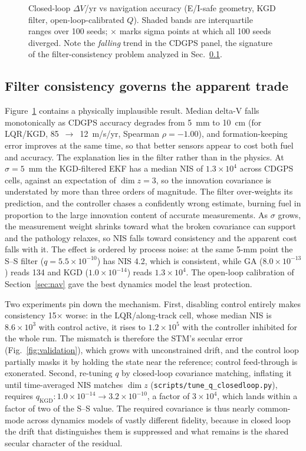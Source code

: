 \begin{figure}[t]
  \centering
  \caption{Closed-loop $\Delta V$/yr vs navigation accuracy (E/I-safe
  geometry, KGD filter, open-loop-calibrated $Q$). Shaded bands are
  interquartile ranges over 100 seeds; $\times$ marks sigma points at which
  all 100 seeds diverged. Note the \emph{falling} trend in the CDGPS panel,
  the signature of the filter-consistency problem analyzed in
  Sec.~\ref{sec:consistency}.}
  \label{fig:headline}
\end{figure}

\subsection{Filter consistency governs the apparent trade}
\label{sec:consistency}

Figure~\ref{fig:headline} contains a physically implausible result. Median
delta-V falls monotonically as CDGPS accuracy degrades from 5~mm to 10~cm
(for LQR/KGD, 85~$\to$~12~m/s/yr, Spearman $\rho = -1.00$), and
formation-keeping error improves at the same time, so that better sensors
appear to cost both fuel and accuracy. The explanation lies in the filter
rather than in the physics. At $\sigma = 5$~mm the KGD-filtered EKF has a
median NIS of $1.3\times10^4$ across CDGPS cells, against an expectation of
$\dim z = 3$, so the innovation covariance is understated by more than three
orders of magnitude. The filter over-weights its prediction, and the
controller chases a confidently wrong estimate, burning fuel in proportion
to the large innovation content of accurate measurements. As $\sigma$ grows,
the measurement weight shrinks toward what the broken covariance can
support and the pathology relaxes, so NIS falls toward consistency and the
apparent cost falls with it. The effect is ordered by process noise: at the
same 5-mm point the S--S filter ($q = 5.5\times10^{-10}$) has NIS 4.2, which
is consistent, while GA ($8.0\times10^{-13}$) reads 134 and KGD
($1.0\times10^{-14}$) reads $1.3\times10^4$. The open-loop calibration of
Section~\ref{sec:nav} gave the best dynamics model the least protection.

Two experiments pin down the mechanism. First, disabling control entirely
makes consistency 15$\times$ worse: in the LQR/along-track cell, whose
median NIS is $8.6\times10^3$ with control active, it rises to
$1.2\times10^5$ with the controller inhibited for the whole run. The
mismatch is therefore the STM's secular error (Fig.~\ref{fig:validation}),
which grows with unconstrained drift, and the control loop partially masks
it by holding the state near the reference; control feed-through is
exonerated. Second, re-tuning $q$ by closed-loop covariance matching,
inflating it until time-averaged NIS matches $\dim z$
(\texttt{scripts/tune\_q\_closedloop.py}), requires
$q_{\mathrm{KGD}}: 1.0\times10^{-14} \to 3.2\times10^{-10}$, a factor of
$3\times10^4$, which lands within a factor of two of the S--S value. The
required covariance is thus nearly common-mode across dynamics models of
vastly different fidelity, because in closed loop the drift that
distinguishes them is suppressed and what remains is the shared secular
character of the residual.

